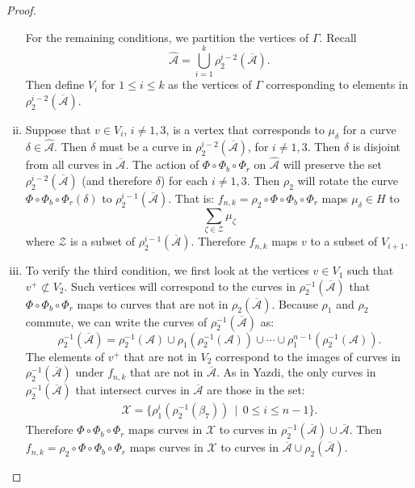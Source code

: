 \begin{proof}
\begin{enumerate}[(i)]
\medskip
For the remaining conditions, we partition the vertices of $\Gamma$.  Recall
$$\widehat{\mathcal{A}} = \bigcup_{i=1}^k \rho_2^{i-2}(\overline{\mathcal{A}}).$$ Then define $V_i$ for
$1 \leq i \leq k$ as the vertices of $\Gamma$ corresponding to elements in
$\rho_2^{i-2}(\overline{\mathcal{A}})$. 
\item Suppose that $v \in V_i$, $i \neq 1,3$, is a vertex
  that corresponds to $\mu_\delta$ for a curve $\delta \in \hat{\mathcal{A}}$. Then $\delta$ must be a curve
  in $\rho_2^{i-2}(\overline{\mathcal{A}})$, for $i \neq 1,3$.  Then $\delta$ is disjoint from all curves in $\overline{\mathcal{A}}$.  The action of $\Phi\circ\Phi_b \circ \Phi_r$ on $\widehat{\mathcal{A}}$ will preserve the set $\rho_2^{i-2}(\overline{\mathcal{A}})$ (and therefore $\delta$) for each $i\neq 1,3$.  %
  Then $\rho_2$ will rotate the curve $\Phi\circ \Phi_b\circ\Phi_r(\delta)$ to $\rho_2^{i-1}(\overline{\mathcal{A}})$. That is: $f_{n,k}=\rho_2\circ\Phi\circ\Phi_b\circ\Phi_r$ maps $\mu_\delta\in H$ to $$\sum_{\zeta\in \mathcal{Z}}\mu_\zeta$$ where $\mathcal{Z}$ is a subset of $\rho_2^{i-1}(\overline{\mathcal{A}})$.  Therefore $f_{n,k}$ maps $v$ to a subset of $V_{i+1}$.
\item To verify the third condition, we first look at the vertices $v \in V_1$ such that $v^+ \not\subset V_2$. Such vertices will correspond to the curves in $\rho_2^{-1}(\overline{\mathcal{A}})$ that $\Phi\circ\Phi_b\circ\Phi_r$ maps to curves that are not in $\rho_2(\overline{\mathcal{A}})$.  Because $\rho_1$ and $\rho_2$ commute, we can write the curves of $\rho_2^{-1}(\overline{\mathcal{A}})$ as: 
    $$\rho_2^{-1}(\overline{\mathcal{A}})=\rho_2^{-1}(\mathcal{A})\cup\rho_1(\rho_2^{-1}(\mathcal{A}))\cup\cdots\cup\rho_1^{n-1}(\rho_2^{-1}(\mathcal{A})).$$  The elements of $v^+$ that are not in $V_2$ correspond to the images of curves in $\rho_2^{-1}(\overline{\mathcal{A}})$ under $f_{n,k}$ that are not in $\overline{\mathcal{A}}$.  
As in Yazdi, the only curves in $\rho_2^{-1}(\overline{\mathcal{A}})$ that intersect curves in $\overline{\mathcal{A}}$ are those in the set: 
\begin{align*}
    \mathcal{X} = \{ \rho_1^i(\rho_2^{-1}(\beta_7))\,\mid\,0\leq i\leq n-1\}.
  \end{align*}
  Therefore $\Phi\circ\Phi_b\circ\Phi_r$ maps curves in $\mathcal{X}$ to curves in $\rho_2^{-1}(\overline{\mathcal{A}})\cup\overline{\mathcal{A}}$.  Then $f_{n,k}=\rho_2\circ\Phi\circ\Phi_b\circ\Phi_r$ maps curves in $\mathcal{X}$ to curves in $\overline{\mathcal{A}}\cup\rho_2(\overline{\mathcal{A}}).$  %

\end{enumerate}
\end{proof}
